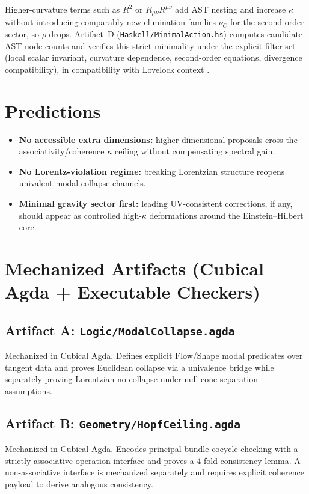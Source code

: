 \documentclass[12pt,a4paper]{article}
\theoremstyle{definition}
\begin{document}
Higher-curvature terms such as $R^2$ or $R_{\mu\nu}R^{\mu\nu}$ add AST nesting and increase $\kappa$ without introducing comparably new elimination families $\nu_C$ for the second-order sector, so $\rho$ drops. Artifact~D (\texttt{Haskell/MinimalAction.hs}) computes candidate AST node counts and verifies this strict minimality under the explicit filter set (local scalar invariant, curvature dependence, second-order equations, divergence compatibility), in compatibility with Lovelock context \cite{lovelock-1971}.

\section{Predictions}

\begin{itemize}[leftmargin=2em]
    \item \textbf{No accessible extra dimensions:} higher-dimensional proposals cross the associativity/coherence $\kappa$ ceiling without compensating spectral gain.
    \item \textbf{No Lorentz-violation regime:} breaking Lorentzian structure reopens univalent modal-collapse channels.
    \item \textbf{Minimal gravity sector first:} leading UV-consistent corrections, if any, should appear as controlled high-$\kappa$ deformations around the Einstein--Hilbert core.
\end{itemize}

\section{Mechanized Artifacts (Cubical Agda + Executable Checkers)}

\subsection*{Artifact A: \texttt{Logic/ModalCollapse.agda}}
Mechanized in Cubical Agda. Defines explicit Flow/Shape modal predicates over tangent data and proves Euclidean collapse via a univalence bridge while separately proving Lorentzian no-collapse under null-cone separation assumptions.

\subsection*{Artifact B: \texttt{Geometry/HopfCeiling.agda}}
Mechanized in Cubical Agda. Encodes principal-bundle cocycle checking with a strictly associative operation interface and proves a 4-fold consistency lemma. A non-associative interface is mechanized separately and requires explicit coherence payload to derive analogous consistency.
\end{document}
